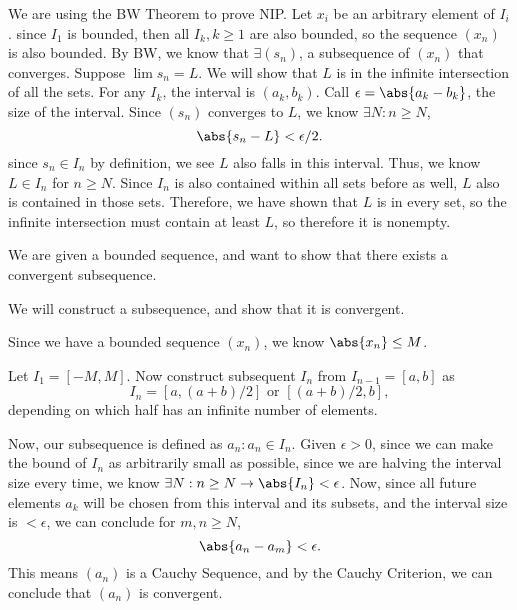 {{\item We are using the BW Theorem to prove NIP. 
Let $x_i$ be an arbitrary element of $I_i$.
since $I_1$ is bounded, then all $I_k, k\geq 1$ are also bounded, 
so the sequence $(x_n)$ is also bounded.
By BW, we know that $\exists (s_n)$, a subsequence of $(x_n)$ that converges.
Suppose $\lim s_n = L$. We will show that $L$ is in the infinite intersection of all the sets.
For any $I_k$, the interval is $(a_k, b_k)$. Call $\epsilon = \abs{a_k - b_k}$, the size of the interval.
Since $(s_n)$ converges to $L$, we know $\exists N : n \geq N$,
\begin{equation*}
	\abs{s_n - L} < \epsilon/2.
\end{equation*} 
since $s_n \in I_n$ by definition, we see $L$ also falls in this interval. Thus, we know 
$L \in I_n$ for $n \geq N$. Since $I_n$ is also contained within all sets before as well, $L$ also 
is contained in those sets. Therefore, we have shown that $L$ is in every set, so the infinite intersection must 
contain at least $L$, so therefore it is nonempty.

\item We are given a bounded sequence, and want to show that there exists a 
convergent subsequence. 

We will construct a subsequence, and show that it is convergent.

Since we have a bounded sequence $(x_n)$, we know $\abs{x_n} \leq M$.

Let $I_1 = [-M, M]$. Now construct subsequent $I_n$ from $I_{n-1} = [a, b]$ as 
\begin{equation*}
	I_n = [a, (a+b)/2] \text{ or } [(a+b)/2, b],
\end{equation*}
depending on which half has an infinite number of elements.

Now, our subsequence is defined as $a_n : a_n \in I_n$. 
Given $\epsilon > 0$, since we can make the bound of $I_n$ 
as arbitrarily small as possible, since we are halving the interval size every time, 
we know $\exists N : n \geq N \rightarrow \abs{I_n} < \epsilon$. 
Now, since all future elements $a_k$ will be chosen from this interval and its subsets,
and the interval size is $< \epsilon$, we can conclude for $m, n \geq N$,
\begin{equation*}
	\abs{a_n - a_m} < \epsilon.
\end{equation*}
This means $(a_n)$ is a Cauchy Sequence, and by the Cauchy Criterion, we can conclude that 
$(a_n)$ is convergent. 
}
}